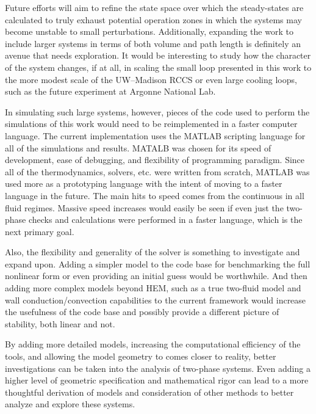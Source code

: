 \documentclass{UWMadThesis}
\begin{document}
Future efforts will aim to refine the state space over which the steady-states are calculated to truly exhaust potential operation zones in which the systems may become unstable to small perturbations.
Additionally, expanding the work to include larger systems in terms of both volume and path length is definitely an avenue that needs exploration.
It would be interesting to study how the character of the system changes, if at all, in scaling the small loop presented in this work to the more modest scale of the UW--Madison RCCS or even large cooling loops, such as the future experiment at Argonne National Lab.

In simulating such large systems, however, pieces of the code used to perform the simulations of this work would need to be reimplemented in a faster computer language.
The current implementation uses the MATLAB scripting language for all of the simulations and results.
MATALB was chosen for its speed of development, ease of debugging, and flexibility of programming paradigm.
Since all of the thermodynamics, solvers, etc. were written from scratch, MATLAB was used more as a prototyping language with the intent of moving to a faster language in the future.
The main hits to speed comes from the continuous  in all fluid regimes.
Massive speed increases would easily be seen if even just the two-phase checks and calculations were performed in a faster language, which is the next primary goal.

Also, the flexibility and generality of the solver is something to investigate and expand upon.
Adding a simpler model to the code base for benchmarking the full nonlinear form or even providing an initial guess would be worthwhile.
And then adding more complex models beyond HEM, such as a true two-fluid model and wall conduction/convection capabilities to the current framework would increase the usefulness of the code base and possibly provide a different picture of stability, both linear and not.


By adding more detailed models, increasing the computational efficiency of the tools, and allowing the model geometry to comes closer to reality, better investigations can be taken into the analysis of two-phase systems.
Even adding a higher level of geometric specification and mathematical rigor can lead to a more thoughtful derivation of models and consideration  of other methods to better analyze and explore these systems.
\end{document}
